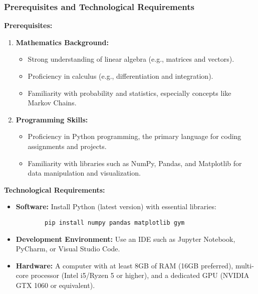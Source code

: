 \documentclass[aspectratio=169]{beamer}
\begin{document}
\begin{frame}[fragile]
    \frametitle{Prerequisites and Technological Requirements}
    \textbf{Prerequisites:}
    \begin{enumerate}
        \item \textbf{Mathematics Background:}
            \begin{itemize}
                \item Strong understanding of linear algebra (e.g., matrices and vectors).
                \item Proficiency in calculus (e.g., differentiation and integration).
                \item Familiarity with probability and statistics, especially concepts like Markov Chains.
            \end{itemize}
        \item \textbf{Programming Skills:}
            \begin{itemize}
                \item Proficiency in Python programming, the primary language for coding assignments and projects.
                \item Familiarity with libraries such as NumPy, Pandas, and Matplotlib for data manipulation and visualization.
            \end{itemize}
    \end{enumerate}

    \vspace{1em}
    
    \textbf{Technological Requirements:}
    \begin{itemize}
        \item \textbf{Software:} Install Python (latest version) with essential libraries:
        \begin{lstlisting}
        pip install numpy pandas matplotlib gym
        \end{lstlisting}
        \item \textbf{Development Environment:} Use an IDE such as Jupyter Notebook, PyCharm, or Visual Studio Code.
        \item \textbf{Hardware:} A computer with at least 8GB of RAM (16GB preferred), multi-core processor (Intel i5/Ryzen 5 or higher), and a dedicated GPU (NVIDIA GTX 1060 or equivalent).
    \end{itemize}
\end{frame}
\end{document}
